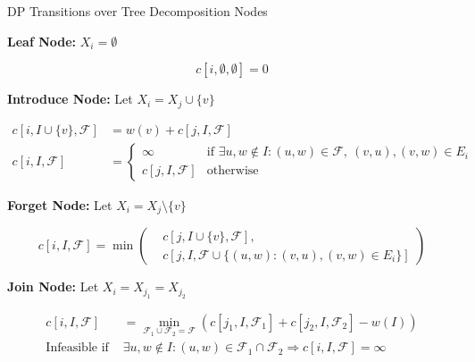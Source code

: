 \documentclass{beamer}
\begin{document}
\begin{frame}{DP Transitions over Tree Decomposition Nodes}
  \small

  \textbf{Leaf Node:} \(X_i = \emptyset\)

  \vspace{-1em}
  \[
  c[i, \emptyset, \emptyset] = 0
  \]

  \textbf{Introduce Node:} 
  Let \( X_i = X_j \cup \{v\} \)

  \vspace{-1em}
  \[
  \begin{aligned}
  c[i, I \cup \{v\}, \mathcal{F}] &= w(v) + c[j, I, \mathcal{F}] \\
  c[i, I, \mathcal{F}] &= 
  \begin{cases}
  \infty & \text{if } \exists u,w \notin I: (u,w) \in \mathcal{F},\ (v,u), (v,w) \in E_i \\
  c[j, I, \mathcal{F}] & \text{otherwise}
  \end{cases}
  \end{aligned}
  \]

  \textbf{Forget Node:}
  Let \( X_i = X_j \setminus \{v\} \)

  \vspace{-0.5em}
  \[
  c[i, I, \mathcal{F}] = \min \left(
  \begin{aligned}
  &c[j, I \cup \{v\}, \mathcal{F}], \\
  &c[j, I, \mathcal{F} \cup \{(u,w) : (v,u), (v,w) \in E_i\}]
  \end{aligned}
  \right)
  \]

  \textbf{Join Node:}
  Let \( X_i = X_{j_1} = X_{j_2} \)

  \vspace{-0.5em}
  \[
  \begin{aligned}
  c[i, I, \mathcal{F}] &= \min_{\mathcal{F}_1 \cup \mathcal{F}_2 = \mathcal{F}} 
  \left( c[j_1, I, \mathcal{F}_1] + c[j_2, I, \mathcal{F}_2] - w(I) \right) \\
  \text{Infeasible if } &\exists u,w \notin I: (u,w) \in \mathcal{F}_1 \cap \mathcal{F}_2 \Rightarrow c[i, I, \mathcal{F}] = \infty
  \end{aligned}
  \]

\end{frame}
\end{document}
